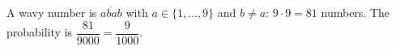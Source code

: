 A wavy number is $\overline{abab}$ with $a\in\{1,\dots,9\}$ and $b\ne a$: $9\cdot9=81$ numbers. The probability is $\dfrac{81}{9000}=\boxed{\dfrac9{1000}}$.
